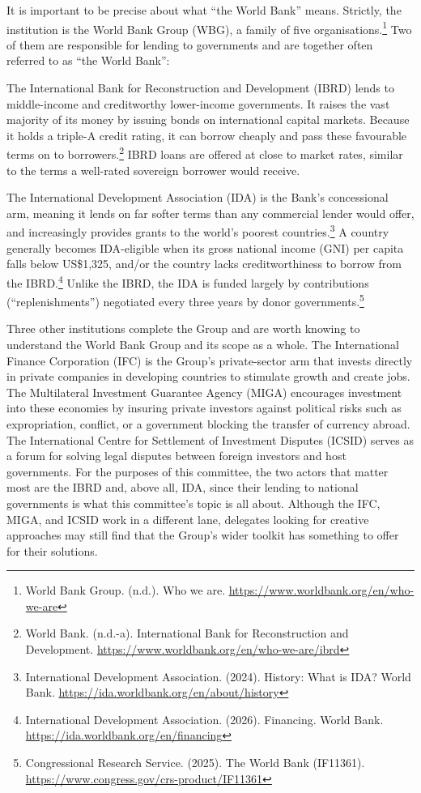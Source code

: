 It is important to be precise about what “the World Bank” means. Strictly, the institution is the World Bank Group (WBG), a family of five organisations.\footnote{World Bank Group. (n.d.). Who we are. \url{https://www.worldbank.org/en/who-we-are}} Two of them are responsible for lending to governments and are together often referred to as “the World Bank”:

The International Bank for Reconstruction and Development (IBRD) lends to middle-income and creditworthy lower-income governments. It raises the vast majority of its money by issuing bonds on international capital markets. Because it holds a triple-A credit rating, it can borrow cheaply and pass these favourable terms on to borrowers.\footnote{World Bank. (n.d.-a). International Bank for Reconstruction and Development. \url{https://www.worldbank.org/en/who-we-are/ibrd}} IBRD loans are offered at close to market rates, similar to the terms a well-rated sovereign borrower would receive.

The International Development Association (IDA) is the Bank’s concessional arm, meaning it lends on far softer terms than any commercial lender would offer, and increasingly provides grants to the world’s poorest countries.\footnote{International Development Association. (2024). History: What is IDA? World Bank. \url{https://ida.worldbank.org/en/about/history}} A country generally becomes IDA-eligible when its gross national income (GNI) per capita falls below US\$1,325, and/or the country lacks creditworthiness to borrow from the IBRD.\footnote{International Development Association. (2026). Financing. World Bank. \url{https://ida.worldbank.org/en/financing}} Unlike the IBRD, the IDA is funded largely by contributions (“replenishments”) negotiated every three years by donor governments.\footnote{Congressional Research Service. (2025). The World Bank (IF11361). \url{https://www.congress.gov/crs-product/IF11361}}

Three other institutions complete the Group and are worth knowing to understand the World Bank Group and its scope as a whole. The International Finance Corporation (IFC) is the Group’s private-sector arm that invests directly in private companies in developing countries to stimulate growth and create jobs. The Multilateral Investment Guarantee Agency (MIGA) encourages investment into these economies by insuring private investors against political risks such as expropriation, conflict, or a government blocking the transfer of currency abroad. The International Centre for Settlement of Investment Disputes (ICSID) serves as a forum for solving legal disputes between foreign investors and host governments. For the purposes of this committee, the two actors that matter most are the IBRD and, above all, IDA, since their lending to national governments is what this committee’s topic is all about. Although the IFC, MIGA, and ICSID work in a different lane, delegates looking for creative approaches may still find that the Group’s wider toolkit has something to offer for their solutions.

